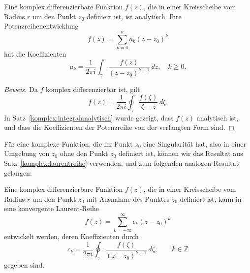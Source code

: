 \begin{satz}
Eine komplex differenzierbare Funktion $f(z)$, die in einer Kreisscheibe
vom Radius $r$ um den Punkt $z_0$ definiert ist, ist analytisch.
Ihre Potenzreihenentwicklung
\[
f(z)=\sum_{k=0}^na_k(z-z_0)^k
\]
hat die Koeffizienten
\[
a_k=\frac1{2\pi i}\int_{\gamma}\frac{f(z)}{(z-z_0)^{k+1}}\,dz,\quad
k\ge 0.
\]
\end{satz}

\begin{proof}[Beweis]
Da $f$ komplex differenzierbar ist, gilt
\[
f(z)=\frac1{2\pi i}\oint_\gamma \frac{f(\zeta)}{\zeta-z}\,d\zeta.
\]
In Satz~\ref{komplex:integralanalytisch} wurde gezeigt, dass $f(z)$
analytisch ist, und dass die Koeffizienten der Potenzreihe von
der verlangten Form sind.
\end{proof}

Für eine komplexe Funktion, die im Punkt $z_0$ eine Singularität hat,
also in einer Umgebung von $z_0$ ohne den Punkt $z_0$ definiert ist,
können wir das Resultat aus Satz~\ref{komplex:laurentreihe} verwenden,
und zum folgenden analogen Resultat gelangen:

\begin{satz}
Eine komplex differenzierbare Funktion $f(z)$, die in einer Kreisscheibe
vom Radius $r$ um den Punkt $z_0$ mit Ausnahme des Punktes $z_0$
definiert ist, kann in eine konvergente Laurent-Reihe
%
\[
f(z)=\sum_{k=-\infty}^{\infty} c_k(z-z_0)^k
\]
entwickelt werden, deren Koeffizienten durch
\[
c_k = \frac1{2\pi i}\oint_\gamma \frac{f(\zeta)}{(z-z_0)^{k+1}}\,d\zeta,\qquad k\in\mathbb Z
\]
gegeben sind.
\end{satz}

